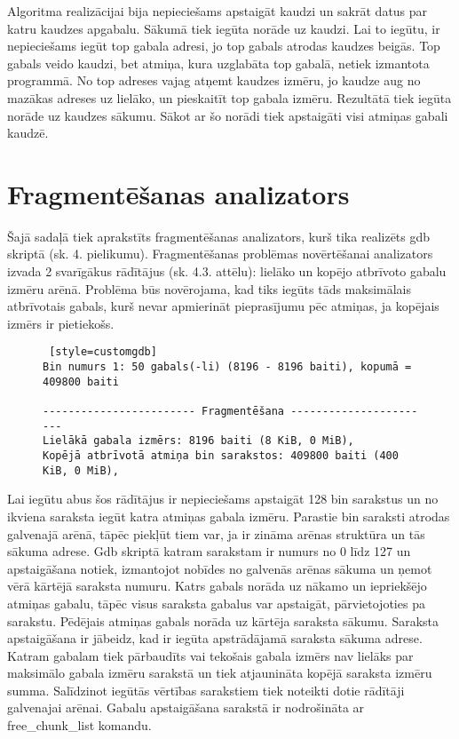 Algoritma realizācijai bija nepieciešams apstaigāt kaudzi un sakrāt datus par katru kaudzes apgabalu.
Sākumā tiek iegūta norāde uz kaudzi. 
Lai to iegūtu, ir nepieciešams iegūt top gabala adresi, jo top gabals atrodas kaudzes beigās.
Top gabals veido kaudzi, bet atmiņa, kura uzglabāta top gabalā, netiek izmantota programmā.
No top adreses vajag atņemt kaudzes izmēru, jo kaudze aug no mazākas adreses uz lielāko, un pieskaitīt top gabala izmēru.
Rezultātā tiek iegūta norāde uz kaudzes sākumu.
Sākot ar šo norādi tiek apstaigāti visi atmiņas gabali kaudzē.



\section{Fragmentēšanas analizators}
Šajā sadaļā tiek aprakstīts fragmentēšanas analizators, kurš tika realizēts gdb skriptā (sk. 4. pielikumu).
Fragmentēšanas problēmas novērtēšanai analizators izvada 2 svarīgākus rādītājus (sk. 4.3. attēlu): lielāko un kopējo atbrīvoto gabalu izmēru arēnā.
Problēma būs novērojama, kad tiks iegūts tāds maksimālais atbrīvotais gabals, kurš nevar apmierināt pieprasījumu pēc atmiņas, ja kopējais izmērs ir pietiekošs.

\begin{figure}[h]
\begin{lstlisting} [style=customgdb]
Bin numurs 1: 50 gabals(-li) (8196 - 8196 baiti), kopumā = 409800 baiti

------------------------ Fragmentēšana -----------------------
Lielākā gabala izmērs: 8196 baiti (8 KiB, 0 MiB),
Kopējā atbrīvotā atmiņa bin sarakstos: 409800 baiti (400 KiB, 0 MiB),
\end{lstlisting}
\caption{\textbf{\fontsize{11}{12}\selectfont {Fragmentēšanas rādītāji}}}
\end{figure}

Lai iegūtu abus šos rādītājus ir nepieciešams apstaigāt 128 bin sarakstus un no ikviena saraksta iegūt katra atmiņas gabala izmēru.
Parastie bin saraksti atrodas galvenajā arēnā, tāpēc piekļūt tiem var, ja ir zināma arēnas struktūra un tās sākuma adrese.
Gdb skriptā katram sarakstam ir numurs no 0 līdz 127 un apstaigāšana notiek, izmantojot nobīdes no galvenās arēnas sākuma un ņemot vērā kārtējā saraksta numuru.
Katrs gabals norāda uz nākamo un iepriekšējo atmiņas gabalu, tāpēc visus saraksta gabalus var apstaigāt, pārvietojoties pa sarakstu.
Pēdējais atmiņas gabals norāda uz kārtēja saraksta sākumu.
Saraksta apstaigāšana ir jābeidz, kad ir iegūta apstrādājamā saraksta sākuma adrese.
Katram gabalam tiek pārbaudīts vai tekošais gabala izmērs nav lielāks par maksimālo gabala izmēru sarakstā un tiek atjaunināta kopējā saraksta izmēru summa.
Salīdzinot iegūtās vērtības sarakstiem tiek noteikti dotie rādītāji galvenajai arēnai.
Gabalu apstaigāšana sarakstā ir nodrošināta ar free\_chunk\_list komandu.

